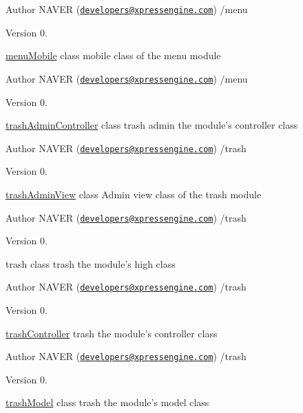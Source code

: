 \begin{DoxyAuthor}{Author}
N\-A\-V\-E\-R (\href{mailto:developers@xpressengine.com}{\tt developers@xpressengine.\-com}) /menu 
\end{DoxyAuthor}
\begin{DoxyVersion}{Version}
0.
\end{DoxyVersion}
\hyperlink{classmenuMobile}{menu\-Mobile} class mobile class of the menu module

\begin{DoxyAuthor}{Author}
N\-A\-V\-E\-R (\href{mailto:developers@xpressengine.com}{\tt developers@xpressengine.\-com}) /menu 
\end{DoxyAuthor}
\begin{DoxyVersion}{Version}
0.
\end{DoxyVersion}
\hyperlink{classtrashAdminController}{trash\-Admin\-Controller} class trash admin the module's controller class

\begin{DoxyAuthor}{Author}
N\-A\-V\-E\-R (\href{mailto:developers@xpressengine.com}{\tt developers@xpressengine.\-com}) /trash 
\end{DoxyAuthor}
\begin{DoxyVersion}{Version}
0.
\end{DoxyVersion}
\hyperlink{classtrashAdminView}{trash\-Admin\-View} class Admin view class of the trash module

\begin{DoxyAuthor}{Author}
N\-A\-V\-E\-R (\href{mailto:developers@xpressengine.com}{\tt developers@xpressengine.\-com}) /trash 
\end{DoxyAuthor}
\begin{DoxyVersion}{Version}
0.
\end{DoxyVersion}
trash class trash the module's high class

\begin{DoxyAuthor}{Author}
N\-A\-V\-E\-R (\href{mailto:developers@xpressengine.com}{\tt developers@xpressengine.\-com}) /trash 
\end{DoxyAuthor}
\begin{DoxyVersion}{Version}
0.
\end{DoxyVersion}
\hyperlink{classtrashController}{trash\-Controller} trash the module's controller class

\begin{DoxyAuthor}{Author}
N\-A\-V\-E\-R (\href{mailto:developers@xpressengine.com}{\tt developers@xpressengine.\-com}) /trash 
\end{DoxyAuthor}
\begin{DoxyVersion}{Version}
0.
\end{DoxyVersion}
\hyperlink{classtrashModel}{trash\-Model} class trash the module's model class

